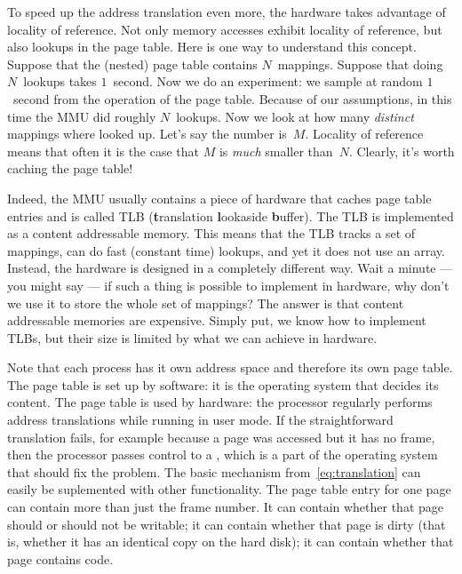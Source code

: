 To speed up the address translation even more,
  the hardware takes advantage of locality of reference.
Not only memory accesses exhibit locality of reference,
  but also lookups in the page table.
Here is one way to understand this concept.
Suppose that the (nested) page table contains $N$~mappings.
Suppose that doing $N$~lookups takes $1$~second.
Now we do an experiment:
  we sample at random $1$~second from the operation of the page table.
Because of our assumptions, in this time the MMU did roughly $N$~lookups.
Now we look at how many \emph{distinct} mappings where looked up.
Let's say the number is~$M$.
Locality of reference means that often it is the case
  that $M$ is \emph{much} smaller than~$N$.
Clearly, it's worth caching the page table!

Indeed, the MMU usually contains a piece of hardware that caches page table entries
  and is called TLB ({\bf t}ranslation {\bf l}ookaside {\bf b}uffer).
The TLB is implemented as a content addressable memory.
This means that the TLB tracks a set of mappings,
  can do fast (constant time) lookups,
  and yet it does not use an array.
Instead, the hardware is designed in a completely different way.
Wait a minute --- you might say ---
  if such a thing is possible to implement in hardware,
  why don't we use it to store the whole set of mappings?
The answer is that content addressable memories are expensive.
Simply put, we know how to implement TLBs,
  but their size is limited by what we can achieve in hardware.

\smallskip

Note that each process has it own address space and therefore its own page table.
The page table is set up by software:
  it is the operating system that decides its content.
The page table is used by hardware:
  the processor regularly performs address translations while running in user mode.
If the straightforward translation fails,
  for example because a page was accessed but it has no frame,
  then the processor passes control to a ,
    which is a part of the operating system that should fix the problem.
The basic mechanism from~\eqref{eq:translation}
  can easily be suplemented with other functionality.
The page table entry for one page can contain more than just the frame number.
It can contain whether that page should or should not be writable;
  it can contain whether that page is dirty
    (that is, whether it has an identical copy on the hard disk);
  it can contain whether that page contains code.




